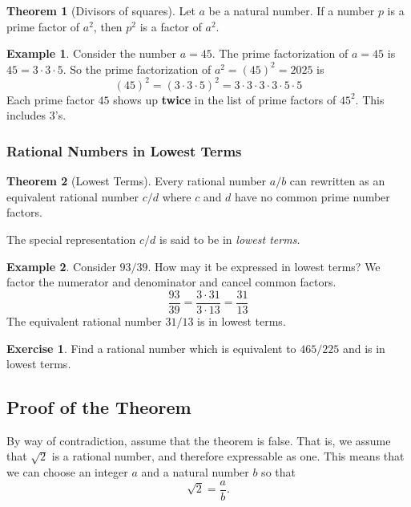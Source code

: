 \documentclass[12pt,letterpaper]{article}
\theoremstyle{definition}
\newtheorem{example}{Example}
\newtheorem{exercise}[question]{Exercise}
\newtheorem{theorem}{Theorem}
\begin{document}
\begin{theorem}[Divisors of squares]
\label{squares}
Let $a$ be a natural number.
If a number $p$ is a prime factor of $a^2$, then $p^2$ is a factor of $a^2$.
\end{theorem}

\begin{example}
Consider the number $a= 45$.
The prime factorization of $a=45$ is $45 = 3\cdot 3 \cdot 5$.
So the prime factorization of $a^2 = (45)^2 =  2025$ is 
\[
(45)^2 =(3\cdot 3 \cdot 5)^2 =  3\cdot 3 \cdot 3 \cdot 3 \cdot 5 \cdot 5
\]
Each prime factor $45$ shows up \textbf{twice} in the list of prime factors of $45^2$.
This includes  $3$'s.
\end{example}


\subsubsection*{Rational Numbers in Lowest Terms}

\begin{theorem}[Lowest Terms]
\label{lowest-terms}
Every rational number $a/b$ can rewritten as an equivalent rational number $c/d$ where $c$ and $d$ have no common prime number factors.
\end{theorem}

The special representation $c/d$ is said to be in \emph{lowest terms.}

\begin{example}
Consider $93/39$.
How may it be expressed in lowest terms?
We factor the numerator and denominator and cancel common factors.
\[
\frac{93}{39} = \frac{3 \cdot 31}{3\cdot 13} = \frac{31}{13}
\]
The equivalent rational number $31/13$ is in lowest terms.
\end{example}

\begin{exercise}
Find a rational number which is equivalent to $465/225$ and is in lowest terms.
\end{exercise}

\subsection*{Proof of the Theorem}

By way of contradiction, assume that the theorem is false.
That is, we assume that $\sqrt{2}$ is a rational number, and therefore expressable as one.
This means that we can choose an integer $a$ and a natural number $b$ so that 
\begin{equation}\label{big-eq}
\sqrt{2} = \frac{a}{b}.
\end{equation}
\end{document}
